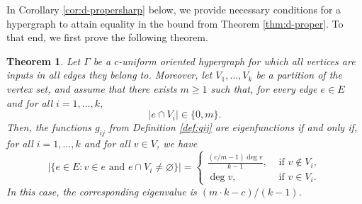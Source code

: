 \documentclass{article}
\theoremstyle{plain}
\newtheorem{theorem}{Theorem}[section]
\theoremstyle{definition}
\theoremstyle{remark}
\begin{document}


In Corollary \ref{cor:d-propersharp} below, we provide necessary conditions for a hypergraph to attain equality in the bound from Theorem \ref{thm:d-proper}. To that end, we first prove the following theorem.



\begin{theorem}\label{thm:uniformd-proper}
     Let $\Gamma$ be a $c$-uniform oriented hypergraph for which all vertices are inputs in all edges they belong to. Moreover, let $V_1,\ldots,V_k$ be a partition of the vertex set, and assume that there exists $m\geq 1$ such that, for every edge $e\in E$ and for all $i=1,\ldots,k$, 
     $$\bigl| e\cap V_i\bigr|\in \bigl\{0,m\bigr\}.$$ Then, the functions $g_{ij}$ from Definition \ref{def:gij} are eigenfunctions if and only if, for all $i=1,\ldots,k$ and for all $v\in V$, we have
    \begin{equation}\label{eq:assumption}
    \bigl| \{e\in E \colon v\in e \text{ and } e\cap V_i \neq \varnothing\}\bigr| = \begin{cases}
        \frac{(c/m-1) \deg v}{k -1}, &\text{ if } v\notin V_i,\\
        \deg v, &\text{ if } v\in V_i.
    \end{cases}
    \end{equation}
   In this case, the corresponding eigenvalue is $(m\cdot k-c)/(k-1)$.
\end{theorem}
\end{document}
